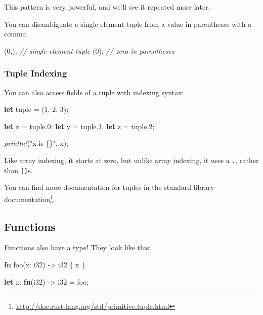 \documentclass[a4paper,]{book}
\renewcommand*{\hypertarget}[3][\ar]{%
  \def\ar{#2}%
  \label{#1}%
  #3}
\newenvironment{Shaded}{\begin{snugshade}}{\end{snugshade}}
\newcommand{\KeywordTok}[1]{\textcolor[rgb]{0.13,0.29,0.53}{\textbf{{#1}}}}
\newcommand{\DataTypeTok}[1]{\textcolor[rgb]{0.13,0.29,0.53}{{#1}}}
\newcommand{\DecValTok}[1]{\textcolor[rgb]{0.00,0.00,0.81}{{#1}}}
\newcommand{\StringTok}[1]{\textcolor[rgb]{0.31,0.60,0.02}{{#1}}}
\newcommand{\CommentTok}[1]{\textcolor[rgb]{0.56,0.35,0.01}{\textit{{#1}}}}
\newcommand{\PreprocessorTok}[1]{\textcolor[rgb]{0.56,0.35,0.01}{\textit{{#1}}}}
\newcommand{\NormalTok}[1]{{#1}}
\renewcommand{\href}[2]{#2\footnote{\url{#1}}}
\begin{document}
This pattern is very powerful, and we'll see it repeated more later.

You can disambiguate a single-element tuple from a value in parentheses
with a comma:

\begin{Shaded}
\begin{Highlighting}[]
\NormalTok{(}\DecValTok{0}\NormalTok{,); }\CommentTok{// single-element tuple}
\NormalTok{(}\DecValTok{0}\NormalTok{); }\CommentTok{// zero in parentheses}
\end{Highlighting}
\end{Shaded}

\subsubsection{Tuple Indexing}\label{tuple-indexing}

You can also access fields of a tuple with indexing syntax:

\begin{Shaded}
\begin{Highlighting}[]
\KeywordTok{let} \NormalTok{tuple = (}\DecValTok{1}\NormalTok{, }\DecValTok{2}\NormalTok{, }\DecValTok{3}\NormalTok{);}

\KeywordTok{let} \NormalTok{x = tuple.}\DecValTok{0}\NormalTok{;}
\KeywordTok{let} \NormalTok{y = tuple.}\DecValTok{1}\NormalTok{;}
\KeywordTok{let} \NormalTok{z = tuple.}\DecValTok{2}\NormalTok{;}

\PreprocessorTok{println!}\NormalTok{(}\StringTok{"x is \{\}"}\NormalTok{, x);}
\end{Highlighting}
\end{Shaded}

Like array indexing, it starts at zero, but unlike array indexing, it
uses a \texttt{.}, rather than \texttt{{[}{]}}s.

You can find more documentation for tuples
\href{http://doc.rust-lang.org/std/primitive.tuple.html}{in the standard
library documentation}.

\hypertarget{functions}{\subsection{Functions}\label{functions}}

Functions also have a type! They look like this:

\begin{Shaded}
\begin{Highlighting}[]
\KeywordTok{fn} \NormalTok{foo(x: }\DataTypeTok{i32}\NormalTok{) -> }\DataTypeTok{i32} \NormalTok{\{ x \}}

\KeywordTok{let} \NormalTok{x: }\KeywordTok{fn}\NormalTok{(}\DataTypeTok{i32}\NormalTok{) -> }\DataTypeTok{i32} \NormalTok{= foo;}
\end{Highlighting}
\end{Shaded}
\end{document}
